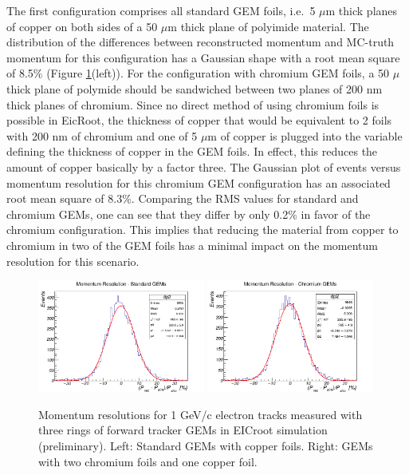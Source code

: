 The first configuration comprises all standard GEM foils, i.e.\ 5 $\mu$m thick planes of copper on both sides of a 50 $\mu$m thick plane of polyimide material. The distribution of the differences between reconstructed momentum and MC-truth momentum for this configuration has a Gaussian shape with a root mean square of 8.5\% (Figure \ref{fig:resolutions}(left)). For the configuration with chromium GEM foils, a 50 $\mu$ thick plane of polymide should be sandwiched between two planes of 200 nm thick planes of chromium. Since no direct method of using chromium foils is possible in EicRoot, the thickness of copper that would be equivalent to 2 foils with 200 nm of chromium and one of 5 $\mu$m of copper is plugged into the variable defining the thickness of copper in the GEM foils. In effect, this reduces the amount of copper basically by a factor three. The Gaussian plot of events versus momentum resolution for this chromium GEM configuration has an associated root mean square of 8.3\%. Comparing the RMS values for standard and chromium GEMs, one can see that they differ by only 0.2\% in favor of the chromium configuration. This implies that reducing the material from copper to chromium in two of the GEM foils has a minimal impact on the momentum resolution for this scenario. 

\begin{figure}[h]
	\centering
	\includegraphics[width=0.49\textwidth]{FIT_plots/MomResStdGEM_25deg1GeV_101818}
	\includegraphics[width=0.49\textwidth]{FIT_plots/MomResCrGEM_25deg1GeV_101818} 
	\caption{Momentum resolutions for 1 GeV/c electron tracks measured with three rings of forward tracker GEMs in EICroot simulation (preliminary). Left: Standard GEMs with copper foils. Right: GEMs with two chromium foils and one copper foil.}
	\label{fig:resolutions}
\end{figure}



